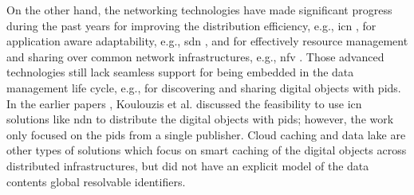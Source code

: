 \documentclass[conference]{IEEEtran}
\begin{document}


On the other hand, the networking technologies have made significant progress during the past years for improving the distribution efficiency, e.g., \gls{icn} \cite{zhang2014named}, for application aware adaptability, e.g., \gls{sdn} \cite{kreutz2014software}, and for effectively resource management and sharing over common network infrastructures, e.g., \gls{nfv} \cite{han2015network}. Those advanced technologies still lack seamless support for being embedded in the data management life cycle, e.g., for discovering and sharing digital objects with \glspl{pid}. In the earlier papers \cite{koulouzis2018information}, Koulouzis et al. discussed the feasibility to use \gls{icn} solutions like \gls{ndn} to distribute the digital objects with \glspl{pid}; however, the work only focused on the \glspl{pid} from a single publisher. Cloud caching \cite{dash_economic_2009} and data lake \cite{6949519} are other types of solutions which focus on smart caching of the digital objects across distributed infrastructures, but did not have an explicit model of the data contents global resolvable identifiers.
\end{document}
